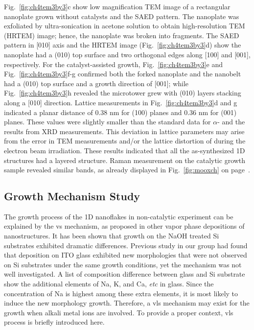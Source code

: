 Fig.~\ref{fig:ch4tem3by3}c show low magnification TEM image of a rectangular nanoplate grown without catalysts and the SAED pattern. The nanoplate was exfoliated by ultra-sonication in acetone solution to obtain high-resolution TEM (HRTEM) image; hence, the nanoplate was broken into fragments. The SAED pattern in [010] axis and the HRTEM image (Fig.~\ref{fig:ch4tem3by3}d) show the nanoplate had a (010) top surface and two orthogonal edges along [100] and [001], respectively. For the catalyst-assisted growth, Fig.~\ref{fig:ch4tem3by3}e and Fig.~\ref{fig:ch4tem3by3}f-g confirmed both the forked nanoplate and the nanobelt had a (010) top surface and a growth direction of [001]; while Fig.~\ref{fig:ch4tem3by3}h revealed the microtower grew with (010) layers stacking along a [010] direction. Lattice measurements in Fig.~\ref{fig:ch4tem3by3}d and g indicated a planar distance of 0.38 nm for (100) planes and 0.36 nm for (001) planes. These values were slightly smaller than the standard data for $\alpha$- and the results from XRD measurements. This deviation in lattice parameters may arise from the error in TEM measurements and/or the lattice distortion of  during the electron beam irradiation.\cite{Wang2004b} These results indicated that all the as-synthesized 1D structures had a layered structure. Raman measurement on the catalytic growth sample revealed similar  bands, as already displayed in Fig.~\ref{fig:mooxch} on page~\pageref{fig:mooxch}. 

\subsection{Growth Mechanism Study}\label{sec:nasi}

The growth process of the 1D  nanoflakes in non-catalytic experiment can be explained by the \gls{vs} mechanism, as proposed in other vapor phase depositions of  nanostructures.\cite{Brezesinski2010, Kalantar-zadeh2010} It has been shown that  growth on the NaOH treated Si substrates exhibited dramatic differences. Previous study in our group had found that  deposition on ITO glass exhibited new morphologies that were not observed on Si substrates under the same growth conditions, yet the mechanism was not well investigated.\cite{predeep2011} A list of composition difference between glass and Si substrate show the additional elements of Na, K, and Ca, \emph{etc} in glass. Since the concentration of Na is highest among these extra elements, it is most likely to induce the new morphology growth. Therefore, a \gls{vls} mechanism may exist for the  growth when alkali metal ions are involved. To provide a proper context, \gls{vls} process is briefly introduced here. 

